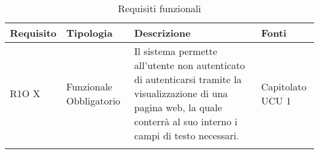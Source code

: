 			\begin{center}
			\bgroup
			\def\arraystretch{1.8}
			\begin{longtable}{ | l | p{2cm} | p{5cm} | p{1.7cm} |}
		        \hline
			\cellcolor[gray]{0.9} \textbf{Requisito} & \cellcolor[gray]{0.9} \textbf{Tipologia} 
			& \cellcolor[gray]{0.9} \textbf{Descrizione} & \cellcolor[gray]{0.9} \textbf{Fonti} \\ \hline
      
				R1O X & Funzionale \newline  Obbligatorio  & Il sistema permette all'utente non autenticato di autenticarsi tramite la visualizzazione di una pagina web, la quale conterrà al suo interno i campi di testo necessari. &  Capitolato \newline  UCU 1 \newline  \\ \hline      

			\caption{Requisiti funzionali}
			\end{longtable}
			\egroup
			\end{center}  
